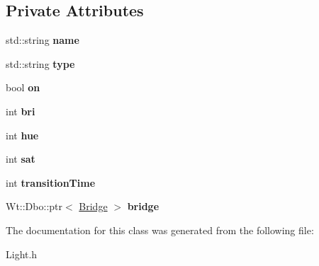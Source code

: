 \subsection*{Private Attributes}
\begin{DoxyCompactItemize}
\item 
std\+::string {\bfseries name}\hypertarget{classLight_aed2e518d1e739c50c31ae77a865f51ed}{}\label{classLight_aed2e518d1e739c50c31ae77a865f51ed}

\item 
std\+::string {\bfseries type}\hypertarget{classLight_a2825ae88a1158e927a6d16bea9175e56}{}\label{classLight_a2825ae88a1158e927a6d16bea9175e56}

\item 
bool {\bfseries on}\hypertarget{classLight_a37ee0b241dbdaff4a13cc269de33a8bf}{}\label{classLight_a37ee0b241dbdaff4a13cc269de33a8bf}

\item 
int {\bfseries bri}\hypertarget{classLight_a34001347a7ae6d2b3e0b12cfedc9aadf}{}\label{classLight_a34001347a7ae6d2b3e0b12cfedc9aadf}

\item 
int {\bfseries hue}\hypertarget{classLight_ae488614d58a7f0dec6ed59b59c6c37e9}{}\label{classLight_ae488614d58a7f0dec6ed59b59c6c37e9}

\item 
int {\bfseries sat}\hypertarget{classLight_afbfb00988ab1c1e0a07fa20941c6f2bf}{}\label{classLight_afbfb00988ab1c1e0a07fa20941c6f2bf}

\item 
int {\bfseries transition\+Time}\hypertarget{classLight_abd73358fde9001da39f147d878f9dab8}{}\label{classLight_abd73358fde9001da39f147d878f9dab8}

\item 
Wt\+::\+Dbo\+::ptr$<$ \hyperlink{classBridge}{Bridge} $>$ {\bfseries bridge}\hypertarget{classLight_ab1491281b58c62b7031fc668e9e5b506}{}\label{classLight_ab1491281b58c62b7031fc668e9e5b506}

\end{DoxyCompactItemize}


The documentation for this class was generated from the following file\+:\begin{DoxyCompactItemize}
\item 
Light.\+h\end{DoxyCompactItemize}
